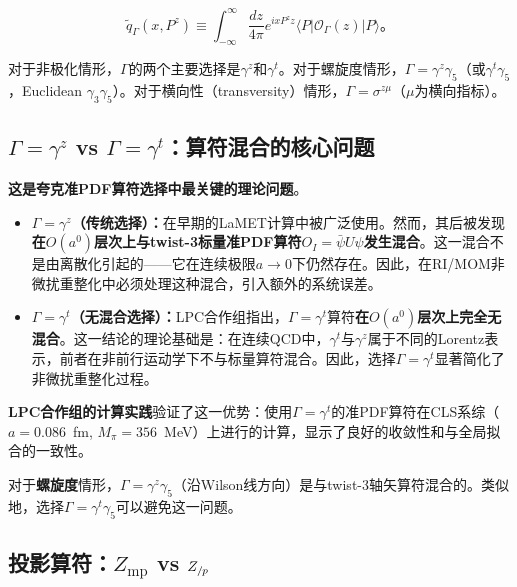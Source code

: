 \documentclass[12pt,a4paper]{ctexart}
\theoremstyle{definition}
\begin{document}
\begin{equation}
\tilde{q}_\Gamma(x, P^z) \equiv \int_{-\infty}^{\infty} \frac{dz}{4\pi} e^{ixP^z z} \langle P| \mathcal{O}_\Gamma(z) |P\rangle。
\label{eq:quasi_pdf_def}
\end{equation}

对于非极化情形，$\Gamma$的两个主要选择是$\gamma^z$和$\gamma^t$。对于螺旋度情形，$\Gamma = \gamma^z\gamma_5$（或$\gamma^t\gamma_5$，Euclidean $\gamma_3\gamma_5$）。对于横向性（transversity）情形，$\Gamma = \sigma^{z\mu}$（$\mu$为横向指标）。

\subsection{$\Gamma = \gamma^z$ vs $\Gamma = \gamma^t$：算符混合的核心问题}
\label{sec:mixing}

\textbf{这是夸克准PDF算符选择中最关键的理论问题}\cite{Liu2019isovector,Alexandrou2017,Chen2016improved}。

\begin{itemize}
    \item \textbf{$\Gamma = \gamma^z$（传统选择）：}在早期的LaMET计算中被广泛使用。然而，其后被发现\textbf{在$O(a^0)$层次上与twist-3标量准PDF算符$O_I = \bar{\psi}U\psi$发生混合}\cite{Liu2019isovector}。这一混合不是由离散化引起的——它在连续极限$a \to 0$下仍然存在。因此，在RI/MOM非微扰重整化中必须处理这种混合，引入额外的系统误差。

    \item \textbf{$\Gamma = \gamma^t$（无混合选择）：}LPC合作组\cite{Liu2019isovector}指出，$\Gamma = \gamma^t$算符\textbf{在$O(a^0)$层次上完全无混合}。这一结论的理论基础是：在连续QCD中，$\gamma^t$与$\gamma^z$属于不同的Lorentz表示，前者在非前行运动学下不与标量算符混合。因此，选择$\Gamma = \gamma^t$显著简化了非微扰重整化过程。
\end{itemize}

\textbf{LPC合作组的计算实践}\cite{Liu2019isovector}验证了这一优势：使用$\Gamma = \gamma^t$的准PDF算符在CLS系综（$a = 0.086$~fm, $M_\pi = 356$~MeV）上进行的计算，显示了良好的收敛性和与全局拟合的一致性。

对于\textbf{螺旋度}情形，$\Gamma = \gamma^z\gamma_5$（沿Wilson线方向）是与twist-3轴矢算符混合的。类似地，选择$\Gamma = \gamma^t\gamma_5$可以避免这一问题\cite{Alexandrou2017}。

\subsection{投影算符：$Z_{\text{mp}}$ vs $Z_{/\mskip-1mu p}$}
\end{document}
